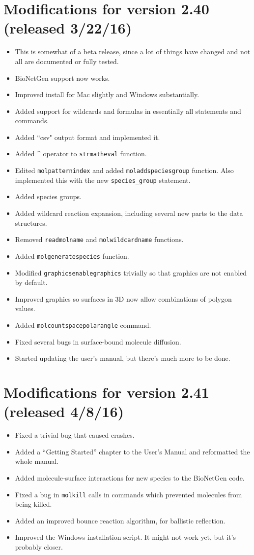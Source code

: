 \documentclass {scrbook}
\newcommand {\ttt} {\texttt}
\begin{document}
\section{Modifications for version 2.40 (released 3/22/16)}
\begin{itemize}
\item This is somewhat of a beta release, since a lot of things have changed and not all are documented or fully tested.
\item BioNetGen support now works.
\item Improved install for Mac slightly and Windows substantially.
\item Added support for wildcards and formulas in essentially all statements and commands.
\item Added ``csv" output format and implemented it.
\item Added \^{} operator to \ttt{strmatheval} function.
\item Edited \ttt{molpatternindex} and added \ttt{moladdspeciesgroup} function. Also implemented this with the new \ttt{species\_group} statement.
\item Added species groups.
\item Added wildcard reaction expansion, including several new parts to the data structures.
\item Removed \ttt{readmolname} and \ttt{molwildcardname} functions.
\item Added \ttt{molgeneratespecies} function.
\item Modified \ttt{graphicsenablegraphics} trivially so that graphics are not enabled by default.
\item Improved graphics so surfaces in 3D now allow combinations of polygon values.
\item Added \ttt{molcountspacepolarangle} command.
\item Fixed several bugs in surface-bound molecule diffusion.
\item Started updating the user's manual, but there's much more to be done.
\end{itemize}

\section{Modifications for version 2.41 (released 4/8/16)}
\begin{itemize}
\item Fixed a trivial bug that caused crashes.
\item Added a ``Getting Started'' chapter to the User's Manual and reformatted the whole manual.
\item Added molecule-surface interactions for new species to the BioNetGen code.
\item Fixed a bug in \ttt{molkill} calls in commands which prevented molecules from being killed.
\item Added an improved bounce reaction algorithm, for ballistic reflection.
\item Improved the Windows installation script. It might not work yet, but it's probably closer.
\end{itemize}
\end{document}
